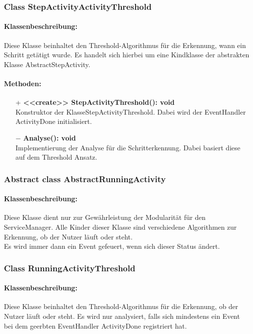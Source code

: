 \documentclass[a4paper,12pt]{article}
\begin{document}
	\subsubsection{Class StepActivityActivityThreshold}
	\paragraph{Klassenbeschreibung:}
	Diese Klasse beinhaltet den Threshold-Algorithmus für die Erkennung, wann ein Schritt getätigt wurde. Es handelt sich hierbei um eine Kindklasse der abstrakten Klasse AbstractStepActivity. 
	\paragraph{Methoden:}
	\begin{itemize}
		\item [+]\textbf{<<create>> StepActivityThreshold(): void}\\Konstruktor der KlasseStepActivityThreshold. Dabei wird der EventHandler ActivityDone initialisiert. 
		\item [$-$]\textbf{Analyse(): void}\\ Implementierung der Analyse für die Schritterkennung. Dabei basiert diese auf dem Threshold Ansatz.  
	\end{itemize}
	
	\subsubsection{Abstract class AbstractRunningActivity}
	\paragraph{Klassenbeschreibung:}
	Diese Klasse dient nur zur Gewährleistung der Modularität für den ServiceManager. Alle Kinder dieser Klasse sind verschiedene Algorithmen zur Erkennung, ob der Nutzer läuft oder steht.\\ Es wird immer dann ein Event gefeuert, wenn sich dieser Status ändert.
	
	\subsubsection{Class RunningActivityThreshold}
	\paragraph{Klassenbeschreibung:}
	Diese Klasse beinhaltet den Threshold-Algorithmus für die Erkennung, ob der Nutzer läuft oder steht. Es wird nur analysiert, falls sich mindestens ein Event bei dem geerbten EventHandler ActivityDone registriert hat.
\end{document}
